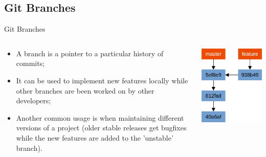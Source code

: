 \documentclass{beamer}
\begin{document}
\subsection{Git Branches}
\begin{frame}{Git Branches}
  \begin{columns}
    \begin{column}{0.6\textwidth}
      \begin{itemize}
        \item A branch is a pointer to a particular history of commits;
        \item It can be used to implement new features locally while other branches are been worked on by other developers;
        \item Another common usage is when maintaining different versions of a project (older stable releases get bugfixes while the new features are added to the 'unstable' branch).
      \end{itemize}
    \end{column}
    \begin{column}{0.4\textwidth}
      \begin{center}
        \includegraphics[scale=0.5]{git-branching}
      \end{center}
    \end{column}
  \end{columns}
\end{frame}
\end{document}
